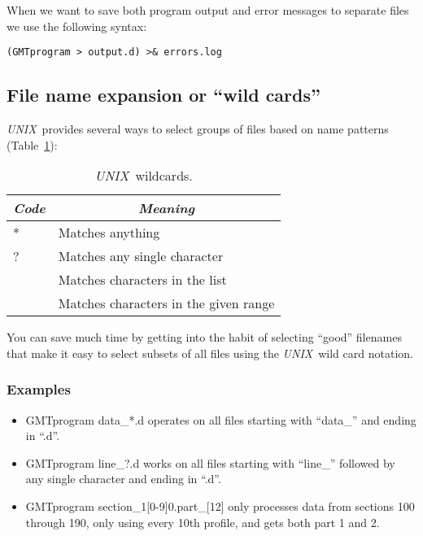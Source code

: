 \documentclass{report}
\newcommand{\UNIX}{\textit{UNIX}}
\begin{document}
When we want to save both program output and error messages to
separate files we use the following syntax:

\begin{verbatim}
(GMTprogram > output.d) >& errors.log
\end{verbatim}

\subsection{File name expansion or ``wild cards''}
\index{UNIX@\UNIX!``wild cards''}

\UNIX\ provides several ways to select groups of files based
on name patterns (Table~\ref{tbl:wildcard}):

\begin{table}[h]
\small
\centering
\begin{tabular}{|l|l|} \hline
\multicolumn{1}{|c|}{\emph{Code}} & \multicolumn{1}{c|}{\emph{Meaning}} \\ \hline
*       &       Matches anything \\ \hline
?       &       Matches any single character \\ \hline
[\emph{list}]   &       Matches characters in the list \\ \hline
[\emph{range}]  &       Matches characters in the given range \\ \hline
\end{tabular}
\caption{\UNIX\ wildcards.} \label{tbl:wildcard}
\end{table}
 
\noindent
You can save much time by getting into the habit of selecting
``good'' filenames that make it easy to select subsets of all
files using the \UNIX\ wild card notation.

\subsubsection{Examples}

\begin{itemize}
\item GMTprogram data\_*.d operates on all files starting with
``data\_'' and ending in ``.d''.

\item GMTprogram line\_?.d works on all files starting with
``line\_'' followed by any single character and ending in ``.d''.

\item GMTprogram section\_1[0-9]0.part\_[12] only processes data
from sections 100 through 190, only using every 10th profile, and
gets both part 1 and 2.

\end{itemize} 
\end{document}
